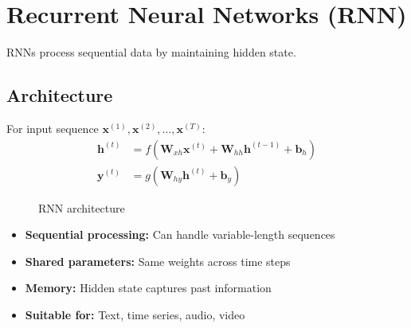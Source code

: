 \section{Recurrent Neural Networks (RNN)}

RNNs process sequential data by maintaining hidden state.

\subsection{Architecture}

For input sequence $\mathbf{x}^{(1)}, \mathbf{x}^{(2)}, \ldots, \mathbf{x}^{(T)}$:
\begin{align}
\mathbf{h}^{(t)} &= f(\mathbf{W}_{xh}\mathbf{x}^{(t)} + \mathbf{W}_{hh}\mathbf{h}^{(t-1)} + \mathbf{b}_h) \\
\mathbf{y}^{(t)} &= g(\mathbf{W}_{hy}\mathbf{h}^{(t)} + \mathbf{b}_y)
\end{align}

\begin{figure}[htbp]
    \centering
    \caption{RNN architecture}
    \label{fig:rnn}
\end{figure}

\begin{properties}
\begin{itemize}
    \item \textbf{Sequential processing:} Can handle variable-length sequences
    \item \textbf{Shared parameters:} Same weights across time steps
    \item \textbf{Memory:} Hidden state captures past information
    \item \textbf{Suitable for:} Text, time series, audio, video
\end{itemize}
\end{properties}

